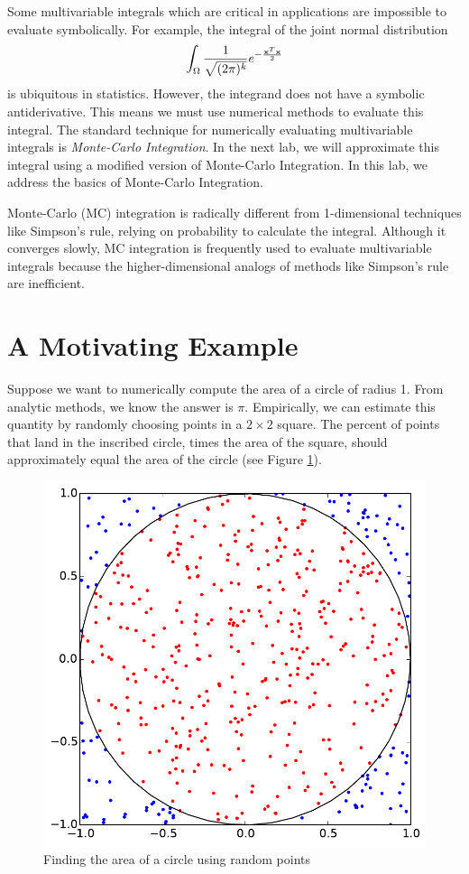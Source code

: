 
Some multivariable integrals which are critical in applications are impossible to evaluate symbolically.
For example, the integral of the joint normal distribution
\[
\int_{\Omega} \frac{1}{\sqrt{(2 \pi)^k}} e^{- \frac{\bold{x}^T\bold{x}}{2}}
\]
is ubiquitous in statistics.
However, the integrand does not have a symbolic antiderivative.
This means we must use numerical methods to evaluate this integral. The standard technique for numerically evaluating multivariable integrals is \emph{Monte-Carlo Integration}. In the next lab, we will approximate this integral using a modified version of Monte-Carlo Integration. In this lab, we address the basics of Monte-Carlo Integration.

Monte-Carlo (MC) integration is radically different from 1-dimensional techniques like Simpson's rule, relying on probability to calculate the integral.
Although it converges slowly, MC integration is frequently used to evaluate multivariable integrals because the higher-dimensional analogs of methods like Simpson's rule are inefficient.

\section*{A Motivating Example}
Suppose we want to numerically compute the area of a circle of radius 1.
From analytic methods, we know the answer is $\pi$.
Empirically, we can estimate this quantity by randomly choosing points in a $2 \times 2$ square.
The percent of points that land in the inscribed circle, times the area of the square, should approximately equal the area of the circle (see Figure \ref{fig:MCCircle}).

\begin{figure}
\includegraphics[width=.7\textwidth]{MC_Circle.pdf}
\caption{Finding the area of a circle using random points}
\label{fig:MCCircle}
\end{figure}

